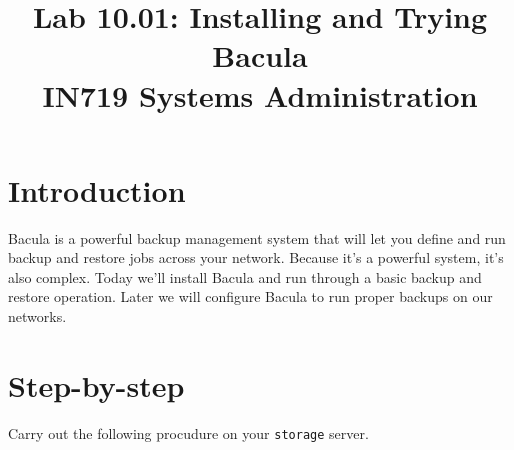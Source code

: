 \documentclass{article}   	%
\title{Lab 10.01:  Installing and Trying Bacula\\ IN719 Systems Administration}
\date{}							%
\begin{document}
\maketitle

\section*{Introduction}
Bacula is a powerful backup management system that will let you define and run backup and restore jobs across your network.  Because it's a powerful system, it's also complex.  Today we'll install Bacula and run through a basic backup and restore operation.  Later we will configure Bacula to run proper backups on our networks.

\section*{Step-by-step}
Carry out the following procudure on your \texttt{storage} server.
\end{document}
